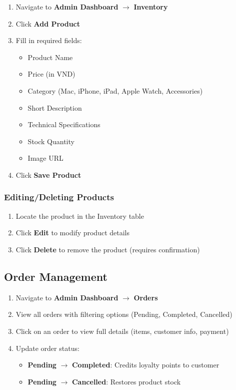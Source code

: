 \documentclass[12pt, a4paper]{report}
\begin{document}
{{\begin{enumerate}
    \item Navigate to \textbf{Admin Dashboard} $\rightarrow$ \textbf{Inventory}
    \item Click \textbf{Add Product}
    \item Fill in required fields:
    \begin{itemize}
        \item Product Name
        \item Price (in VND)
        \item Category (Mac, iPhone, iPad, Apple Watch, Accessories)
        \item Short Description
        \item Technical Specifications
        \item Stock Quantity
        \item Image URL
    \end{itemize}
    \item Click \textbf{Save Product}
\end{enumerate}

\subsubsection{Editing/Deleting Products}

\begin{enumerate}
    \item Locate the product in the Inventory table
    \item Click \textbf{Edit} to modify product details
    \item Click \textbf{Delete} to remove the product (requires confirmation)
\end{enumerate}

\subsection{Order Management}

\begin{enumerate}
    \item Navigate to \textbf{Admin Dashboard} $\rightarrow$ \textbf{Orders}
    \item View all orders with filtering options (Pending, Completed, Cancelled)
    \item Click on an order to view full details (items, customer info, payment)
    \item Update order status:
    \begin{itemize}
        \item \textbf{Pending} $\rightarrow$ \textbf{Completed}: Credits loyalty points to customer
        \item \textbf{Pending} $\rightarrow$ \textbf{Cancelled}: Restores product stock
    \end{itemize}
\end{enumerate}

}}
\end{document}
